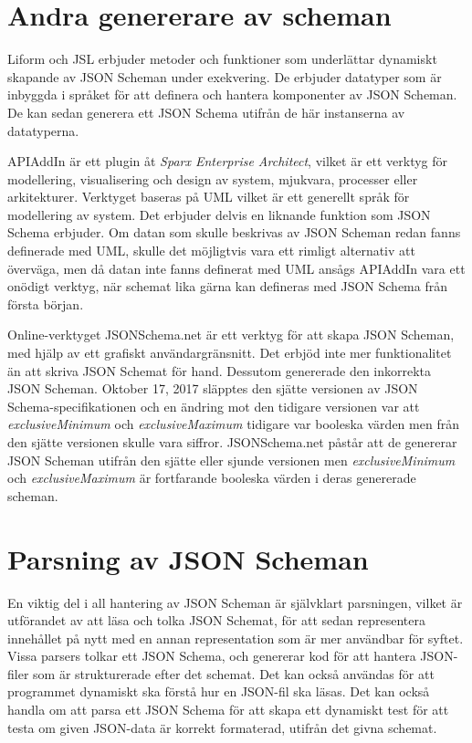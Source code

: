 \section{Andra genererare av scheman}
Liform och JSL erbjuder metoder och funktioner som underlättar dynamiskt skapande av JSON Scheman under exekvering. De erbjuder datatyper som är inbyggda i språket för att definera och hantera komponenter av JSON Scheman. De kan sedan generera ett JSON Schema utifrån de här instanserna av datatyperna. \cite{Romanovich,Limenius}

APIAddIn är ett plugin åt \textit{Sparx Enterprise Architect}, vilket är ett verktyg för modellering, visualisering och design av system, mjukvara, processer eller arkitekturer. Verktyget baseras på UML vilket är ett generellt språk för modellering av system. Det erbjuder delvis en liknande funktion som JSON Schema erbjuder. Om datan som skulle beskrivas av JSON Scheman redan fanns definerade med UML, skulle det möjligtvis vara ett rimligt alternativ att överväga, men då datan inte fanns definerat med UML ansågs APIAddIn vara ett onödigt verktyg, när schemat lika gärna kan defineras med JSON Schema från första början. \cite{Tomlinson}

Online-verktyget JSONSchema.net är ett verktyg för att skapa JSON Scheman, med hjälp av ett grafiskt användargränsnitt. Det erbjöd inte mer funktionalitet än att skriva JSON Schemat för hand. Dessutom genererade den inkorrekta JSON Scheman. Oktober 17, 2017 släpptes den sjätte versionen av JSON Schema-specifikationen och en ändring mot den tidigare versionen var att \textit{exclusiveMinimum} och \textit{exclusiveMaximum} tidigare var booleska värden men från den sjätte versionen skulle vara siffror. \cite{Andrews} JSONSchema.net påstår att de genererar JSON Scheman utifrån den sjätte eller sjunde versionen men \textit{exclusiveMinimum} och \textit{exclusiveMaximum} är fortfarande booleska värden i deras genererade scheman. \cite{Jackwootton}

\section{Parsning av JSON Scheman}

En viktig del i all hantering av JSON Scheman är självklart parsningen, vilket är utförandet av att läsa och tolka JSON Schemat, för att sedan representera innehållet på nytt med en annan representation som är mer användbar för syftet. Vissa parsers tolkar ett JSON Schema, och genererar kod för att hantera JSON-filer som är strukturerade efter det schemat. Det kan också användas för att programmet dynamiskt ska förstå hur en JSON-fil ska läsas. Det kan också handla om att parsa ett JSON Schema för att skapa ett dynamiskt test för att testa om given JSON-data är korrekt formaterad, utifrån det givna schemat.

